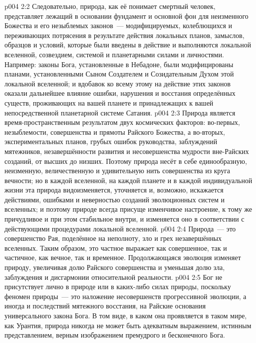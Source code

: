 \vs p004 2:2 Следовательно, природа, как её понимает смертный человек, представляет лежащий в основании фундамент и основной фон для неизменного Божества и его незыблемых законов~--- модифицируемых, колеблющихся и переживающих потрясения в результате действия локальных планов, замыслов, образцов и условий, которые были введены в действие и выполняются локальной вселенной, созвездием, системой и планетарными силами и личностями. Например: законы Бога, установленные в Небадоне, были модифицированы планами, установленными Сыном Создателем и Созидательным Духом этой локальной вселенной; и вдобавок ко всему этому на действие этих законов оказали дальнейшее влияние ошибки, нарушения и восстания определённых существ, проживающих на вашей планете и принадлежащих к вашей непосредственной планетарной системе Сатания.
\vs p004 2:3 \pc Природа является время\hyp{}пространственным результатом двух космических факторов: во\hyp{}первых, незыблемости, совершенства и прямоты Райского Божества, а во\hyp{}вторых, экспериментальных планов, грубых ошибок руководства, заблуждений мятежников, незавершённости развития и несовершенства мудрости вне\hyp{}Райских созданий, от высших до низших. Поэтому природа несёт в себе единообразную, неизменную, величественную и удивительную нить совершенства из круга вечности; но в каждой вселенной, на каждой планете и в каждой индивидуальной жизни эта природа видоизменяется, уточняется и, возможно, искажается действиями, ошибками и неверностью созданий эволюционных систем и вселенных; и поэтому природе всегда присуще изменчивое настроение, к тому же причудливое и при этом стабильное внутри, и изменяется оно в соответствии с действующими процедурами локальной вселенной.
\vs p004 2:4 Природа~--- это совершенство Рая, поделённое на неполноту, зло и грех незавершённых вселенных. Таким образом, это частное выражает как совершенное, так и частичное, как вечное, так и временное. Продолжающаяся эволюция изменяет природу, увеличивая долю Райского совершенства и уменьшая долю зла, заблуждения и дисгармонии относительной реальности.
\vs p004 2:5 \pc Бог не присутствует лично в природе или в каких\hyp{}либо силах природы, поскольку феномен природы~--- это наложение несовершенств прогрессивной эволюции, а иногда и последствий мятежного восстания, на Райские основания универсального закона Бога. В том виде, в каком она проявляется в таком мире, как Урантия, природа никогда не может быть адекватным выражением, истинным представлением, верным изображением премудрого и бесконечного Бога.
